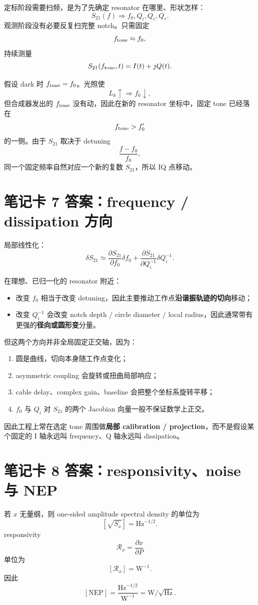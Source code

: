 \documentclass[11pt,a4paper,openany]{ctexrep}
\begin{document}
定标阶段需要扫频，是为了先确定 resonator 在哪里、形状怎样：
\[
S_{21}(f)\Rightarrow f_0,Q_i,Q_c,Q_r.
\]
观测阶段没有必要反复扫完整 notch。只需固定
\[
f_{\rm tone}\approx f_0,
\]
持续测量
\[
S_{21}(f_{\rm tone},t)=I(t)+jQ(t).
\]

假设 dark 时 $f_{\rm tone}=f_0$。光照使
\[
L_k\uparrow\Rightarrow f_0\downarrow,
\]
但合成器发出的 $f_{\rm tone}$ 没有动，因此在新的 resonator 坐标中，固定 tone 已经落在
\[
f_{\rm tone}>f_0'
\]
的一侧。由于 $S_{21}$ 取决于 detuning
\[
\frac{f-f_0}{f_0},
\]
同一个固定频率自然对应一个新的复数 $S_{21}$，所以 IQ 点移动。

\section{笔记卡 7 答案：frequency / dissipation 方向}

局部线性化：
\[
\delta S_{21}
\simeq
\frac{\partial S_{21}}{\partial f_0}\delta f_0
+
\frac{\partial S_{21}}{\partial Q_i^{-1}}\delta Q_i^{-1}.
\]

在理想、已归一化的 resonator 附近：
\begin{itemize}
  \item 改变 $f_0$ 相当于改变 detuning，因此主要推动工作点\textbf{沿谐振轨迹的切向}移动；
  \item 改变 $Q_i^{-1}$ 会改变 notch depth / circle diameter / local radius，因此通常带有更强的\textbf{径向或圆形变}分量。
\end{itemize}

但这两个方向并非全局固定正交轴，因为：
\begin{enumerate}
  \item 圆是曲线，切向本身随工作点变化；
  \item asymmetric coupling 会旋转或扭曲局部响应；
  \item cable delay、complex gain、baseline 会把整个坐标系旋转平移；
  \item $f_0$ 与 $Q_i$ 对 $S_{21}$ 的两个 Jacobian 向量一般不保证数学上正交。
\end{enumerate}
因此工程上常在选定 tone 周围做\textbf{局部 calibration / projection}，而不是假设某个固定的 I 轴永远叫 frequency、Q 轴永远叫 dissipation。

\section{笔记卡 8 答案：responsivity、noise 与 NEP}

若 $x$ 无量纲，则 one-sided amplitude spectral density 的单位为
\[
[\sqrt{S_x}]=\mathrm{Hz}^{-1/2}.
\]
responsivity
\[
\mathcal R_x=\frac{\partial x}{\partial P}
\]
单位为
\[
[\mathcal R_x]=\mathrm{W}^{-1}.
\]
因此
\[
[\mathrm{NEP}]
=\frac{\mathrm{Hz}^{-1/2}}{\mathrm{W}^{-1}}
=\boxed{\mathrm{W}/\sqrt{\mathrm{Hz}}}.
\]
\end{document}
